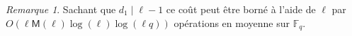 \documentclass[10pt,a4paper]{book}
\theoremstyle{plain}
\theoremstyle{definition}
\theoremstyle{definition}
\theoremstyle{definition}
\theoremstyle{definition}
\theoremstyle{definition}
\theoremstyle{remark}
\newtheorem{rem}[thm]{Remarque}
\theoremstyle{remark}
\theoremstyle{definition}
\begin{document}
 
\begin{rem}
Sachant que $d_1 \mid \ell-1$ ce coût peut être borné à l'aide de $\ell$ par
$O(\ell\mathsf{M}(\ell)\log(\ell)\log(\ell q))$ opérations en moyenne sur 
$\mathbb{F}_q$.
\end{rem}
 
\end{document}
